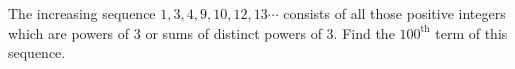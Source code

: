 The increasing sequence $1,3,4,9,10,12,13\cdots$ consists of all those positive integers which are powers of 3 or sums of distinct powers of 3. Find the $100^{\text{th}}$ term of this sequence.